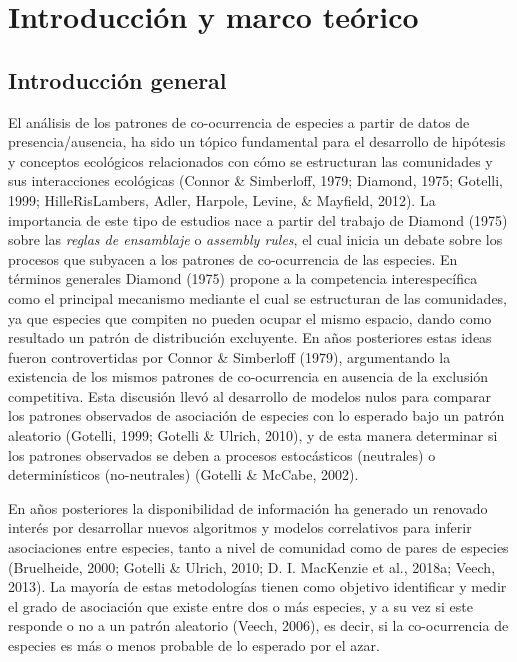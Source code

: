 \documentclass[12pt,twoside]{reedthesis}
\begin{document}
\hypertarget{introducciuxf3n-y-marco-teuxf3rico}{%
\chapter{Introducción y marco teórico}\label{introducciuxf3n-y-marco-teuxf3rico}}

\hypertarget{introducciuxf3n-general}{%
\section{Introducción general}\label{introducciuxf3n-general}}

El análisis de los patrones de co-ocurrencia de especies a partir de datos de presencia/ausencia, ha sido un tópico fundamental para el desarrollo de hipótesis y conceptos ecológicos relacionados con cómo se estructuran las comunidades y sus interacciones ecológicas
(Connor \& Simberloff, 1979; Diamond, 1975; Gotelli, 1999; HilleRisLambers, Adler, Harpole, Levine, \& Mayfield, 2012). La importancia de este tipo de estudios nace a partir del trabajo de Diamond (1975) sobre las \emph{reglas de ensamblaje} o \emph{assembly rules}, el cual inicia un debate sobre los procesos que subyacen a los patrones de co-ocurrencia de las especies. En términos generales Diamond (1975) propone a la competencia interespecífica como el principal mecanismo mediante el cual se estructuran de las comunidades, ya que especies que compiten no pueden ocupar el mismo espacio, dando como resultado un patrón de distribución excluyente. En años posteriores estas ideas fueron controvertidas por Connor \& Simberloff (1979), argumentando la existencia de los mismos patrones de co-ocurrencia en ausencia de la exclusión competitiva. Esta discusión llevó al desarrollo de modelos nulos para comparar los patrones observados de asociación de especies con lo esperado bajo un patrón aleatorio (Gotelli, 1999; Gotelli \& Ulrich, 2010), y de esta manera determinar si los patrones observados se deben a procesos estocásticos (neutrales) o determinísticos (no-neutrales) (Gotelli \& McCabe, 2002).

En años posteriores la disponibilidad de información ha generado un renovado interés por desarrollar nuevos algoritmos y modelos correlativos para inferir asociaciones entre especies, tanto a nivel de comunidad como de pares de especies (Bruelheide, 2000; Gotelli \& Ulrich, 2010; D. I. MacKenzie et al., 2018a; Veech, 2013). La mayoría de estas metodologías tienen como objetivo identificar y medir el grado de asociación que existe entre dos o más especies, y a su vez si este responde o no a un patrón aleatorio (Veech, 2006), es decir, si la co-ocurrencia de especies es más o menos probable de lo esperado por el azar.
\end{document}
